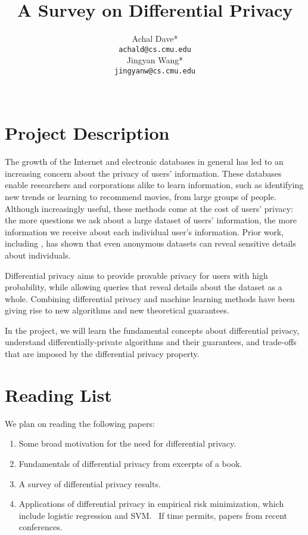 \documentclass{article} %
\title{A Survey on Differential Privacy}
\author{
Achal Dave* \\
\texttt{achald@cs.cmu.edu} \\
\And
Jingyan Wang* \\
\texttt{jingyanw@cs.cmu.edu} \\
\\
}
\begin{document}
\maketitle

\section{Project Description}
The growth of the Internet and electronic databases in general has led to an
increasing concern about the privacy of users' information. These databases
enable researchers and corporations alike to learn information, such as
identifying new trends or learning to recommend movies, from large
groups of people. Although increasingly useful, these methods come at the cost
of users' privacy: the more questions we ask about a large dataset of users'
information, the more information we receive about each individual user's
information. Prior work, including \cite{narayanan2008robust,
sweeney1997weaving, ganta2008composition}, has shown that even anonymous
datasets can reveal sensitive details about individuals.

Differential privacy aims to provide provable privacy for users with high probability, while allowing queries that reveal details about the dataset as a whole. Combining differential privacy and machine learning methods have been giving rise to new algorithms and new theoretical guarantees.

In the project, we will learn the fundamental concepts about differential privacy, understand differentially-private algorithms and their guarantees, and trade-offs that are imposed by the differential privacy property.

\section{Reading List}
We plan on reading the following papers:
\begin{enumerate}
\item Some broad motivation for the need for differential privacy. \cite{narayanan2008robust}
\item Fundamentals of differential privacy from excerpts of a book. \cite{dwork2014algorithmic}
\item A survey of differential privacy results. \cite{dwork2008differential}
\item Applications of differential privacy in empirical risk minimization, which include logistic regression and SVM.~\cite{chaudhuri2011differentially} If time permits, papers from recent conferences.
\end{enumerate}

{\small


}
\end{document}
